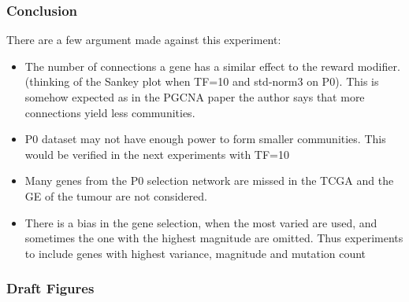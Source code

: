 \subsubsection{Conclusion}

There are a few argument made against this experiment:
\begin{itemize}
    \item The number of connections a gene has a similar effect to the reward modifier. (thinking of the Sankey plot when TF=10 and std-norm3 on P0). This is somehow expected as in the PGCNA paper the author says that more connections yield less communities.
    \item P0 dataset may not have enough power to form smaller communities. This would be verified in the next experiments with TF=10
    \item Many genes from the P0 selection network are missed in the TCGA and the GE of the tumour are not considered.
    \item There is a bias in the gene selection, when the most varied are used, and sometimes the one with the highest magnitude are omitted. Thus experiments to include genes with highest variance, magnitude and mutation count
\end{itemize}


\subsubsection{Draft Figures}


